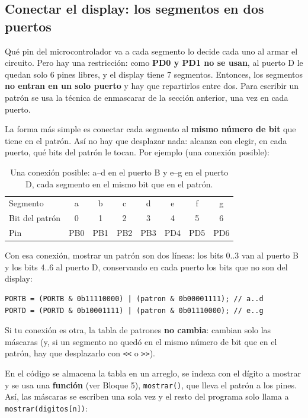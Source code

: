 \subsection{Conectar el display: los segmentos en dos puertos}

Qué pin del microcontrolador va a cada segmento lo decide cada uno al armar el
circuito. Pero hay una restricción: como \textbf{PD0 y PD1 no se usan}, al puerto D le
quedan solo 6 pines libres, y el display tiene 7 segmentos. Entonces, los segmentos
\textbf{no entran en un solo puerto} y hay que repartirlos entre dos. Para escribir un
patrón se usa la técnica de enmascarar de la sección anterior, una vez en cada puerto.

La forma más simple es conectar cada segmento al \textbf{mismo número de bit} que tiene
en el patrón. Así no hay que desplazar nada: alcanza con elegir, en cada puerto, qué
bits del patrón le tocan. Por ejemplo (una conexión posible):

\begin{table}[H]
\centering
\begin{tabular}{lccccccc}
\toprule
Segmento & a & b & c & d & e & f & g \\
Bit del patrón & 0 & 1 & 2 & 3 & 4 & 5 & 6 \\
Pin & PB0 & PB1 & PB2 & PB3 & PD4 & PD5 & PD6 \\
\bottomrule
\end{tabular}
\caption{Una conexión posible: a--d en el puerto B y e--g en el puerto D, cada segmento en el mismo bit que en el patrón.}
\end{table}

Con esa conexión, mostrar un patrón son dos líneas: los bits 0..3 van al puerto B y
los bits 4..6 al puerto D, conservando en cada puerto los bits que no son del display:

\begin{lstlisting}[style=estilo-c]
PORTB = (PORTB & 0b11110000) | (patron & 0b00001111); // a..d
PORTD = (PORTD & 0b10001111) | (patron & 0b01110000); // e..g
\end{lstlisting}

\begin{notabox}
Si tu conexión es otra, la tabla de patrones \textbf{no cambia}: cambian solo las
máscaras (y, si un segmento no quedó en el mismo número de bit que en el patrón, hay
que desplazarlo con \texttt{<{}<} o \texttt{>{}>}).
\end{notabox}

En el código se almacena la tabla en un arreglo, se indexa con el dígito a mostrar y
se usa una \textbf{función} (ver Bloque 5), \texttt{mostrar()}, que lleva el patrón a los
pines. Así, las máscaras se escriben una sola vez y el resto del programa solo llama a
\texttt{mostrar(digitos[n])}:

